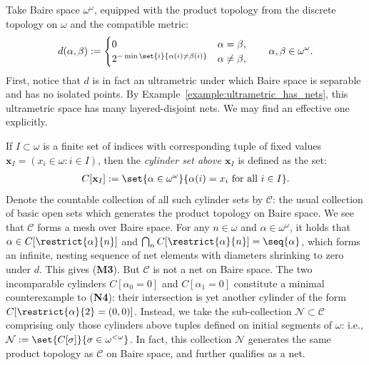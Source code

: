\begin{example}
    \label{example:Baire_space_has_net_Borel_measure}
    Take Baire space $\omega^{\omega}$, equipped with the product topology from the discrete topology on $\omega$ and the compatible metric:
    \begin{align*}
        d(\alpha, \beta) := \begin{cases} 
            0 & \alpha = \beta,\\
            2^{-\min \set{i}{\alpha(i) \neq \beta(i)}} & \alpha \neq \beta,
        \end{cases} \qquad \alpha, \beta \in \omega^{\omega}.
    \end{align*}
    First, notice that $d$ is in fact an ultrametric under which Baire space is separable and has no isolated points. By Example~\ref{example:ultrametric_has_nets}, this ultrametric space has many layered-disjoint nets. We may find an effective one explicitly. 
    
    If $I \subset \omega$ is a finite set of indices with corresponding tuple of fixed values $\mathbf{x}_I = (x_i \in \omega : i \in I)$, then the \textit{cylinder set above $\mathbf{x}_I$} is defined as the set:
    \begin{align*}
        C[\mathbf{x}_I] := \set{\alpha \in \omega^{\omega}}{\alpha(i) = x_i \text{ for all } i \in I}.
    \end{align*}
    Denote the countable collection of all such cylinder sets by $\mathcal{C}$: the usual collection of basic open sets which generates the product topology on Baire space. We see that $\mathcal{C}$ forms a mesh over Baire space. For any $n \in \omega$ and $\alpha \in \omega^{\omega}$, it holds that $\alpha \in C[\restrict{\alpha}{n}]$ and $\bigcap_n C[\restrict{\alpha}{n}] = \seq{\alpha}$, which forms an infinite, nesting sequence of net elements with diameters shrinking to zero under $d$. This gives (\textbf{M3}). But $\mathcal{C}$ is not a net on Baire space. The two incomparable cylinders $C[\alpha_0 = 0]$ and $C[\alpha_1 = 0]$ constitute a minimal counterexample to (\textbf{N4}): their intersection is yet another cylinder of the form $C[\restrict{\alpha}{2} = (0, 0)]$. Instead, we take the sub-collection $\mathcal{N} \subset \mathcal{C}$ comprising only those cylinders above tuples defined on initial segments of $\omega$: i.e., $\mathcal{N} := \set{C[\sigma]}{\sigma \in \omega^{<\omega}}$.
    In fact, this collection $\mathcal{N}$ generates the same product topology as $\mathcal{C}$ on Baire space, and further qualifies as a net. 
    

\end{example}
